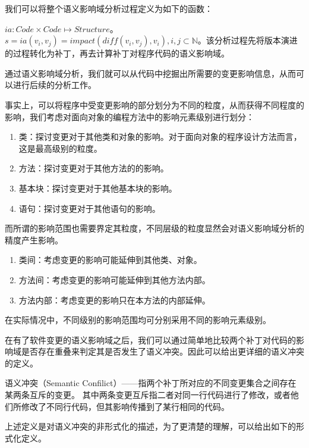 我们可以将整个语义影响域分析过程定义为如下的函数：

\begin{definition}
	$ia: Code \times Code \mapsto {Structure}$。$s = ia(v_i,v_j) = impact(diff(v_i,v_j),v_i),i,j \subset \mathbb{N}$。该分析过程先将版本演进的过程转化为补丁，再去计算补丁对程序代码的语义影响域。
\end{definition}

通过语义影响域分析，我们就可以从代码中挖掘出所需要的变更影响信息，从而可以进行后续的分析工作。

事实上，可以将程序中受变更影响的部分划分为不同的粒度，从而获得不同程度的影响\cite{petrenko2009variable}，我们考虑对面向对象的编程方法中的影响元素级别进行划分：

\begin{enumerate}
	\item 类：探讨变更对于其他类和对象的影响。对于面向对象的程序设计方法而言，这是最高级别的粒度。
	\item 方法：探讨变更对于其他方法的的影响。
	\item 基本块：探讨变更对于其他基本块的影响。
	\item 语句：探讨变更对于其他语句的影响。
\end{enumerate}

而所谓的影响范围也需要界定其粒度，不同层级的粒度显然会对语义影响域分析的精度产生影响。

\begin{enumerate}
	\item 类间：考虑变更的影响可能延伸到其他类、对象。
	\item 方法间：考虑变更的影响可能延伸到其他方法内部。
	\item 方法内部：考虑变更的影响只在本方法的内部延伸。
\end{enumerate}

在实际情况中，不同级别的影响范围均可分别采用不同的影响元素级别。

在有了软件变更的语义影响域之后，我们可以通过简单地比较两个补丁对代码的影响域是否存在重叠来判定其是否发生了语义冲突。因此可以给出更详细的语义冲突的定义。

\begin{definition}
	\label {define_conflict}
	语义冲突（Semantic Confilict）——指两个补丁所对应的不同变更集合之间存在某两条互斥的变更。
	其中两条变更互斥指二者对同一行代码进行了修改，或者他们所修改了不同行代码，但其影响传播到了某行相同的代码。
\end{definition}

上述定义是对语义冲突的非形式化的描述，为了更清楚的理解，可以给出如下的形式化定义。


